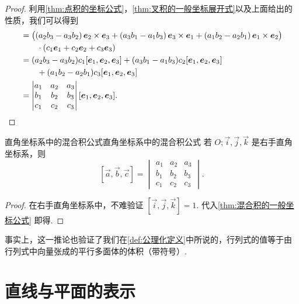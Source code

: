 \begin{proof}
    利用\autoref{thm:点积的坐标公式}，\autoref{thm:叉积的一般坐标展开式}以及上面给出的性质，我们可以得到
    \begin{align*}
        [\vec{a}, \vec{b}, \vec{c}]
         & = \bigl((a_2 b_3 - a_3 b_2)\,\vec{e}_2\times\vec{e}_3
        + (a_3 b_1 - a_1 b_3)\,\vec{e}_3\times\vec{e}_1
        + (a_1 b_2 - a_2 b_1)\,\vec{e}_1\times\vec{e}_2\bigr) \\
         &\qquad \cdot (c_1 \vec{e}_1 + c_2 \vec{e}_2 + c_3 \vec{e}_3) \\
         & = (a_2 b_3 - a_3 b_2) c_1 [\vec{e}_1, \vec{e}_2, \vec{e}_3]
        + (a_3 b_1 - a_1 b_3) c_2 [\vec{e}_1, \vec{e}_2, \vec{e}_3] \\
         &\qquad + (a_1 b_2 - a_2 b_1) c_3 [\vec{e}_1, \vec{e}_2, \vec{e}_3] \\
         & = \begin{vmatrix}
            a_1 & a_2 & a_3 \\
            b_1 & b_2 & b_3 \\
            c_1 & c_2 & c_3
        \end{vmatrix}
        [\vec{e}_1, \vec{e}_2, \vec{e}_3]. \qedhere
    \end{align*}
\end{proof}

\begin{corollary}{直角坐标系中的混合积公式}{直角坐标系中的混合积公式}
    若 $O;\vec{i},\vec{j},\vec{k}$ 是右手直角坐标系，则
    \[
        [\vec{a}, \vec{b}, \vec{c}] =
        \begin{vmatrix}
            a_1 & a_2 & a_3 \\
            b_1 & b_2 & b_3 \\
            c_1 & c_2 & c_3
        \end{vmatrix}.
    \]
\end{corollary}

\begin{proof}
    在右手直角坐标系中，不难验证 $[\vec{i},\vec{j},\vec{k}] = 1$. 代入\autoref{thm:混合积的一般坐标公式} 即得.
\end{proof}

事实上，这一推论也验证了我们在\autoref{def:公理化定义}中所说的，行列式的值等于由行列式中向量张成的平行多面体的体积（带符号）.

\section{直线与平面的表示}

